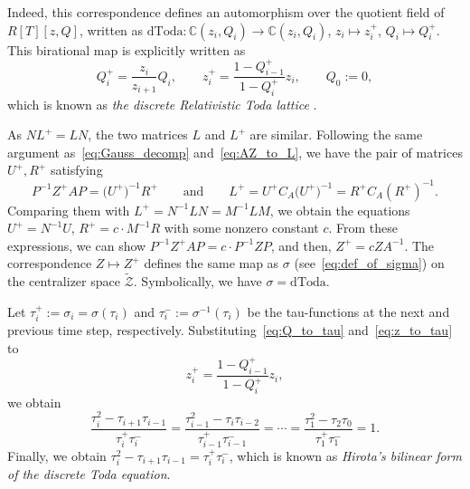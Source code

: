 \documentclass[pdftex]{sigma}
\numberwithin{equation}{section}
\def\CC{\mathord{\mathbb{C}}}
\theoremstyle{definition}
\begin{document}
Indeed, this correspondence defines an automorphism over the quotient field of~$R[T][z,Q]$, written as
$%
\mathrm{dToda}\colon \CC(z_i,Q_i)\to \CC(z_i,Q_i)$, $ z_i\mapsto z_i^+$, $ Q_i\mapsto Q_i^+$.
This birational map is explicitly written as
\[
Q^+_i=\frac{z_{i}}{z_{i+1}}Q_i, \qquad
z^+_i=\frac{1-Q^+_{i-1}}{1-Q^+_{i}}z_i
, \qquad Q_0:=0,
\]
which is known as \textit{the discrete Relativistic Toda lattice} \cite{Suris}.


As $NL^+=LN$, the two matrices $L$ and $L^+$ are similar.
Following the same argument as~\eqref{eq:Gauss_decomp} and~\eqref{eq:AZ_to_L}, we have the pair of matrices $U^+,R^+$ satisfying
\[
P^{-1}Z^+AP=\bigl(U^+\bigr)^{-1}R^+\qquad \mbox{and} \qquad L^+=U^+C_A\bigl(U^+\bigr)^{-1}=R^+C_A(R^+)^{-1}.
\]
Comparing them with $L^+=N^{-1}LN=M^{-1}LM$, we obtain the equations
$
U^{+}=N^{-1}U$, $ R^+=c \cdot M^{-1}R
$
with some nonzero constant $c$.
From these expressions, we can show $P^{-1}Z^+AP=c\cdot P^{-1}ZP$, and then,
$%
Z^+=cZA^{-1}$.
The correspondence $Z\mapsto Z^+$ defines the same map as $\sigma$ (see~\eqref{eq:def_of_sigma}) on the centralizer space $\tilde{\mathscr{Z}}$.
Symbolically, we have $\sigma=\mathrm{dToda}$.

Let
$\tau^+_i:=\sigma_i=\sigma(\tau_i)$
and $\tau^-_i:=\sigma^{-1}(\tau_i)$ be the tau-functions at the next and previous time step, respectively.
Substituting~\eqref{eq:Q_to_tau} and~\eqref{eq:z_to_tau} to
\[
z_i^+=\frac{1-Q^+_{i-1}}{1-Q^+_{i}}z_i,
\] we obtain
\[
\frac{\tau_i^2-\tau_{i+1}\tau_{i-1}}{\tau_i^+\tau_i^-}=
\frac{\tau_{i-1}^2-\tau_{i}\tau_{i-2}}{\tau_{i-1}^+\tau_{i-1}^-}=\cdots
=
\frac{\tau_{1}^2-\tau_{2}\tau_{0}}{\tau_{1}^+\tau_{1}^-}=1.
\]
Finally, we obtain
$%
\tau_i^2-\tau_{i+1}\tau_{i-1}=\tau_i^+\tau_i^-$,
which is known as \textit{Hirota's bilinear form of the discrete Toda equation}.
\end{document}
